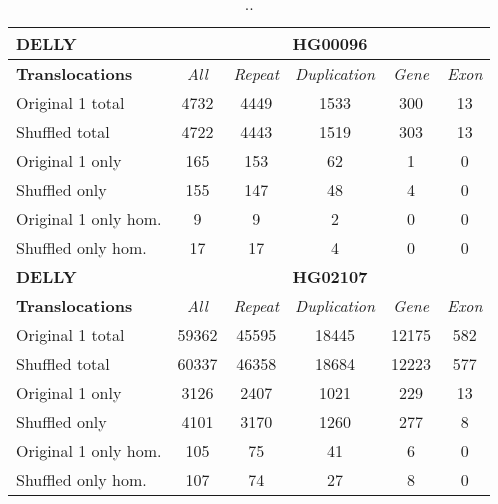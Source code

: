 \begin{table}[htb]
\begin{center}
\begin{tabular}{|l|c||c|c|c|c|}
\hline
{\bf DELLY} & \multicolumn{5}{|c|}{\bf HG00096} \\
\hline
\cline{2-6}
{\bf Translocations} & {\it All} & {\it Repeat} & {\it Duplication} & {\it Gene} & {\it Exon} \\
\hline
Original 1 total & 4732 & 4449 & 1533 & 300 & 13\\ 
\hline
Shuffled total & 4722 & 4443 & 1519 & 303 & 13\\ 
\hline
Original 1 only & 165 & 153 & 62 & 1 & 0\\ 
\hline
Shuffled only & 155 & 147 & 48 & 4 & 0\\ 
\hline
Original 1 only hom. & 9 & 9 & 2 & 0 & 0\\ 
\hline
Shuffled only hom. & 17 & 17 & 4 & 0 & 0\\ 
\hline
\hline
{\bf DELLY} & \multicolumn{5}{|c|}{\bf HG02107} \\
\hline
\cline{2-6}
{\bf Translocations} & {\it All} & {\it Repeat} & {\it Duplication} & {\it Gene} & {\it Exon} \\
\hline
Original 1 total & 59362 & 45595 & 18445 & 12175 & 582\\ 
\hline
Shuffled total & 60337 & 46358 & 18684 & 12223 & 577\\ 
\hline
Original 1 only & 3126 & 2407 & 1021 & 229 & 13\\ 
\hline
Shuffled only & 4101 & 3170 & 1260 & 277 & 8\\ 
\hline
Original 1 only hom. & 105 & 75 & 41 & 6 & 0\\ 
\hline
Shuffled only hom. & 107 & 74 & 27 & 8 & 0\\ 
\hline
\end{tabular}
\end{center}
\caption{ .. }
\label{tab:orig-vs-shuf-delly-trans}
\end{table}

